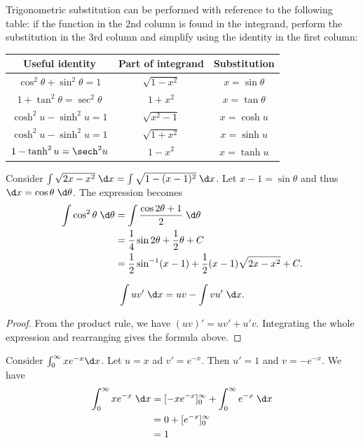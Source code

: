 \documentclass[a4paper]{article}
\begin{document}
Trigonometric substitution can be performed with reference to the following table: if the function in the 2nd column is found in the integrand, perform the substitution in the 3rd column and simplify using the identity in the first column:
\begin{center}
  \begin{tabular}{ccc}
    \toprule
    Useful identity & Part of integrand & Substitution \\
    \midrule
    $\cos^2\theta + \sin^2\theta = 1$ & $\sqrt{1 - x^2}$ & $x = \sin \theta$ \\
    $1 + \tan^2\theta = \sec^2\theta$ & $1 + x^2$ & $x = \tan\theta$ \\
    $\cosh^2u - \sinh^2 u = 1$ & $\sqrt{x^2 - 1}$ & $x=\cosh u$ \\
    $\cosh^2u - \sinh^2 u = 1$ & $\sqrt{1 + x^2}$ & $x=\sinh u$ \\
    $1 - \tanh^2 u = \sech^2u$ & $1 - x^2$ & $x = \tanh u$ \\
    \bottomrule
  \end{tabular}
\end{center}
\begin{eg}
  Consider $\int \sqrt{2x - x^2}\;\d x = \int\sqrt{1 - (x - 1)^2}\;\d x$. Let $x - 1=\sin\theta$ and thus $\d x = \cos \theta\;\d\theta$. The expression becomes
  \begin{align*}
    \int \cos^2\theta \;\d \theta &= \int\frac{\cos 2\theta + 1}{2}\;\d \theta\\
    &= \frac{1}{4}\sin 2\theta + \frac{1}{2}\theta + C\\
    &= \frac{1}{2}\sin^{-1}(x - 1) + \frac{1}{2}(x - 1)\sqrt{2x - x^2} + C.
  \end{align*}
\end{eg}

\begin{thm}
  \[
    \int uv'\;\d x = uv - \int vu' \;\d x.
  \]
\end{thm}

\begin{proof}
  From the product rule, we have $(uv)' = uv' + u'v$. Integrating the whole expression and rearranging gives the formula above.
\end{proof}

\begin{eg}
  Consider $\int_0^\infty xe^{-x}\d x$. Let $u = x$ ad $v' = e^{-x}$. Then $u' = 1$ and $v = -e^{-x}$. We have
  \begin{align*}
    \int_0^\infty xe^{-x}\;\d x &= [-xe^{-x}]^\infty_0 + \int_0^\infty e^{-x} \;\d x\\
    &= 0 + [e^{-x}]_0^\infty\\
    &= 1
  \end{align*}
\end{eg}
\end{document}
